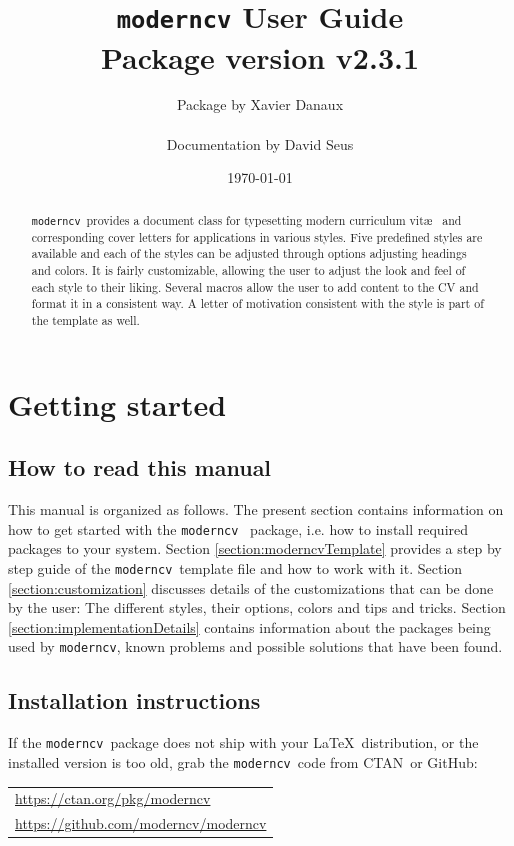 \documentclass[a4paper,11pt]{article}
\title{\texttt{moderncv} User Guide\\{\small Package version v2.3.1}}
\author{Package by Xavier Danaux \\ \begin{small}Documentation by David Seus \end{small}}
\date{\today}
\newcommand{\code}[1]{\lstinline!#1!}
\newcommand{\Code}[1]{\lstinline!#1!~} %
\newcommand{\moderncv}{\code{moderncv}}
\newcommand{\Moderncv}{\Code{moderncv}}
\newcommand{\github}{GitHub}
\newcommand{\Ctan}{CTAN~}
\newcommand{\moderncvGithub}{\url{https://github.com/moderncv/moderncv}}
\newcommand{\moderncvCtan}{\url{https://ctan.org/pkg/moderncv}}
\begin{document}
\maketitle
\begin{abstract}
\noindent
\Moderncv provides a document class for typesetting modern curriculum vit\ae~ and corresponding cover letters
for applications in various styles.
Five predefined styles are available and each of the styles can be adjusted through options adjusting headings and colors.
It is fairly customizable, allowing the user to adjust the look and feel of each style to their liking.
Several macros allow the user to add content to the CV and format it in a consistent way.
A letter of motivation consistent with the style is part of the template as well.
\end{abstract}
\tableofcontents

\section{Getting started}
\subsection{How to read this manual}
This manual is organized as follows.
The present section contains information on how to get started with the \Moderncv
package, i.e. how to install required packages to your system.
%
%
Section \ref{section:moderncvTemplate} provides a step by step guide of the \Moderncv template file and how to work with it.
%
Section \ref{section:customization} discusses details of the customizations that can be done by the user:
The different styles, their options, colors and tips and tricks.
%
Section \ref{section:implementationDetails} contains information about the packages being used by \moderncv,
known problems and possible solutions that have been found.

\subsection{Installation instructions}
If the \Moderncv package does not ship with your \LaTeX\ distribution, or the installed version is too old,
grab the \Moderncv code from \Ctan or \github: \medskip

\begin{tabular}{l}
  \moderncvCtan \\%
  \moderncvGithub
\end{tabular}
\end{document}
